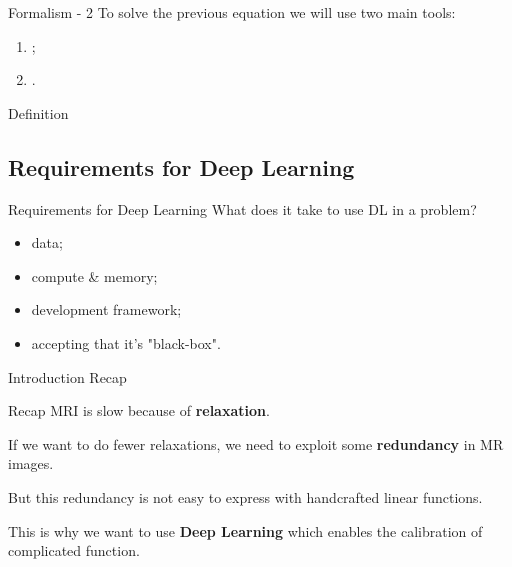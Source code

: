 \begin{frame}{Formalism - 2}
    To solve the previous equation we will use two main tools:
    
    \begin{enumerate}
        \item {};
        \item<2> .
    \end{enumerate}

    
        \begin{block}{Definition}
        \end{block}    
    
\end{frame}

\subsection{Requirements for Deep Learning}
\begin{frame}{Requirements for Deep Learning}
    What does it take to use DL in a problem?
    \begin{itemize}[<+->]
        \item data;
        \item compute \& memory;
        \item development framework;
        \item accepting that it's "black-box".
    \end{itemize}
\end{frame}


\begin{frame}{Introduction Recap}
    \begin{block}{Recap}
        MRI is slow because of \textbf{relaxation}.
        
        \pause
        If we want to do fewer relaxations, we need to exploit some \textbf{redundancy} in MR images.
        
        \pause
        But this redundancy is not easy to express with handcrafted linear functions.
        
        \pause
        This is why we want to use \textbf{Deep Learning} which enables the calibration of complicated function.
    \end{block}
\end{frame}
